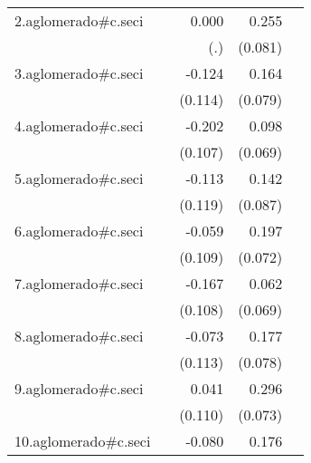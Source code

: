 {\begin{longtable}{l*{4}{D{.}{.}{-1}}}
\addlinespace
2.aglomerado#c.seci&                     &       0.000         &       0.255\sym{**} &                     \\
            &                     &         (.)         &     (0.081)         &                     \\
\addlinespace
3.aglomerado#c.seci&                     &      -0.124         &       0.164\sym{*}  &                     \\
            &                     &     (0.114)         &     (0.079)         &                     \\
\addlinespace
4.aglomerado#c.seci&                     &      -0.202         &       0.098         &                     \\
            &                     &     (0.107)         &     (0.069)         &                     \\
\addlinespace
5.aglomerado#c.seci&                     &      -0.113         &       0.142         &                     \\
            &                     &     (0.119)         &     (0.087)         &                     \\
\addlinespace
6.aglomerado#c.seci&                     &      -0.059         &       0.197\sym{**} &                     \\
            &                     &     (0.109)         &     (0.072)         &                     \\
\addlinespace
7.aglomerado#c.seci&                     &      -0.167         &       0.062         &                     \\
            &                     &     (0.108)         &     (0.069)         &                     \\
\addlinespace
8.aglomerado#c.seci&                     &      -0.073         &       0.177\sym{*}  &                     \\
            &                     &     (0.113)         &     (0.078)         &                     \\
\addlinespace
9.aglomerado#c.seci&                     &       0.041         &       0.296\sym{***}&                     \\
            &                     &     (0.110)         &     (0.073)         &                     \\
\addlinespace
10.aglomerado#c.seci&                     &      -0.080         &       0.176\sym{**} &                     \\

\end{longtable}}
